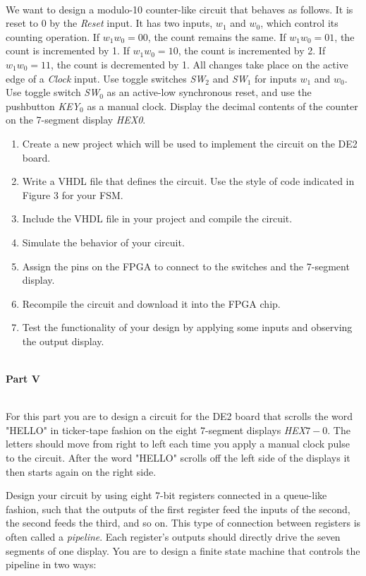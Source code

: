 \documentclass[epsfig,10pt,fullpage]{article}
\begin{document}
~\\
\noindent
We want to design a modulo-10 counter-like circuit that behaves as follows.
It is reset to 0 by the {\it Reset} input.
It has two inputs, $w_1$ and $w_0$, which control its counting operation.
If $w_1 w_0 = 00$, the count remains the same. If $w_1 w_0 = 01$, the count
is incremented by 1. If $w_1 w_0 = 10$, the count is incremented by 2.
If $w_1 w_0 = 11$, the count is decremented by 1. All changes take place on
the active edge of a {\it Clock} input.
Use toggle switches {\it SW}$_2$ and {\it SW}$_1$ for inputs $w_1$ and $w_0$.
Use toggle switch {\it SW}$_0$ as an active-low synchronous reset, and use
the pushbutton {\it KEY}$_0$ as a manual clock.
Display the decimal contents of the counter on the 7-segment display {\it HEX0}.
\begin{enumerate}
\item Create a new project which will be used to implement the 
circuit on the DE2 board.
\item Write a VHDL file that defines the circuit. Use the style of code indicated
in Figure 3 for your FSM.
\item Include the VHDL file in your project and compile the circuit.
\item Simulate the behavior of your circuit.
\item Assign the pins on the FPGA to connect to the switches and the 7-segment
display.
\item Recompile the circuit and download it into the FPGA chip.
\item Test the functionality of your design by applying some inputs
and observing the output display.
\end{enumerate}

~\\
\noindent
{\bf Part V}

~\\
\noindent
For this part you are to design a circuit for the DE2 board that
scrolls the word "HELLO" in ticker-tape fashion
on the eight 7-segment displays {\it HEX}$7-0$. The 
letters should move from right to left each time you apply a manual clock pulse 
to the circuit. After the word "HELLO" scrolls off the left side of the displays 
it then starts again on the right side. 

Design your circuit by using eight 7-bit registers connected in a queue-like
fashion, such that the outputs of the first register feed the inputs of the
second, the second feeds the third, and so on. This type of connection between registers
is often called a {\it pipeline}. Each register's outputs
should directly drive the seven segments of one display. You are to design a finite state
machine that controls the pipeline in two ways:
\end{document}
